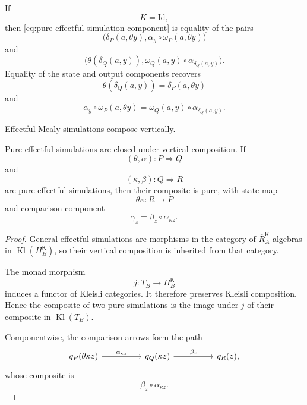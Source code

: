 \begin{remark}
\label{rem:effectful-simulations-recover-deterministic}
    If
    \[
        K=\mathrm{Id},
    \]
    then
    \eqref{eq:pure-effectful-simulation-component} is equality of the pairs
    \[
        \bigl(
            \delta_P(a,\theta y),
            \alpha_y\circ\omega_P(a,\theta y)
        \bigr)
    \]
    and
    \[
        \bigl(
            \theta(\delta_Q(a,y)),
            \omega_Q(a,y)\circ
            \alpha_{\delta_Q(a,y)}
        \bigr).
    \]
    Equality of the state and output components recovers
    \[
        \theta(\delta_Q(a,y))
        =
        \delta_P(a,\theta y)
    \]
    and
    \[
        \alpha_y\circ\omega_P(a,\theta y)
        =
        \omega_Q(a,y)\circ
        \alpha_{\delta_Q(a,y)}.
    \]
\end{remark}

\begin{proposition}
\label{prop:vertical-composition-effectful-simulations}
    Effectful Mealy simulations compose vertically.

    Pure effectful simulations are closed under vertical composition. If
    \[
        (\theta,\alpha):
        P\Rightarrow Q
    \]
    and
    \[
        (\kappa,\beta):
        Q\Rightarrow R
    \]
    are pure effectful simulations, then their composite is pure, with state
    map
    \[
        \theta\kappa:R\to P
    \]
    and comparison component
    \[
        \gamma_z
        =
        \beta_z\circ\alpha_{\kappa z}.
    \]
\end{proposition}
\begin{proof}
    General effectful simulations are morphisms in the category of
    \(\overline R_A^{\mathsf K}\)-algebras in
    \(\operatorname{Kl}(H_B^{\mathsf K})\), so their vertical composition is
    inherited from that category.

    The monad morphism
    \[
        j:T_B\to H_B^{\mathsf K}
    \]
    induces a functor of Kleisli categories. It therefore preserves Kleisli
    composition. Hence the composite of two pure simulations is the image
    under \(j\) of their composite in \(\operatorname{Kl}(T_B)\).

    Componentwise, the comparison arrows form the path
    \[
        \begin{tikzcd}[column sep=huge]
                q_P(\theta\kappa z)
                    \arrow[r, "\alpha_{\kappa z}"]
            &
                q_Q(\kappa z)
                    \arrow[r, "\beta_z"]
            &
                q_R(z),
        \end{tikzcd}
    \]
    whose composite is
    \[
        \beta_z\circ\alpha_{\kappa z}.
    \]
\end{proof}

